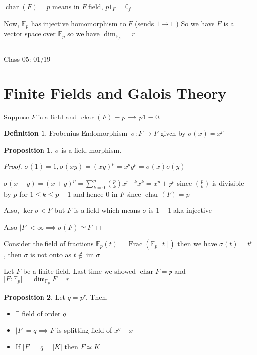 \documentclass{article}
\theoremstyle{definition}
\newtheorem{definition}{Definition}
\newtheorem{proposition}{Proposition}
\begin{document}
\(\operatorname{char}(F) = p \) means in \(F\) field, \(p 1_F = 0_f\)

Now, \(\mathbb{F} _p\) has injective homomorphism to \(F\) (sends \(1\to 1\) ) So we have \(F\) is a vector space over \(\mathbb{F} _p\) so we have \(\dim_{\mathbb{F} _p}=r\) 

\hfil
\hrule

Class 05: 01/19

\section*{Finite Fields and Galois Theory}

Suppose \(F\) is a field and \(\operatorname{char}(F) = p \implies p1 = 0\).

\begin{definition}
    Frobenius Endomorphism: \(\sigma : F \to F\) given by \(\sigma (x)=x^p\) 
\end{definition}

\begin{proposition}
    \(\sigma \) is a field morphism.
\end{proposition}

\begin{proof}
    \(\sigma (1)=1,\sigma (xy)=(xy)^p=x^p y^p = \sigma(x)\sigma (y)\)
    
    \(\sigma (x+y)=(x+y)^p=\sum_{k=0}^{p} \binom{p}{k}x^{p-k}x^k=x^p + y^p \) since \(\binom{p}{k}\) is divisible by \(p\) for \(1\leq k \leq p-1\) and hence \(0\) in \(F\) since \(\operatorname{char}(F) = p\) 
   
    Also, \(\ker \sigma \triangleleft F\) but \(F\) is a field which means \(\sigma \) is \(1-1\) aka injective
    
    Also \(\vert F \vert < \infty \implies \sigma(F) \simeq F\) 

\end{proof}

Consider the field of fractions \(\mathbb{F} _p(t)=\operatorname{Frac}(\mathbb{F} _p[t]) \) then we have \(\sigma(t)=t^p\), then \(\sigma\) is not onto as \(t\notin \operatorname{im}\sigma \)  

Let \(F\) be a finite field. Last time we showed \(\operatorname{char} F = p\) and \(\vert F : \mathbb{F}_p \vert = \dim_{\mathbb{F}_p}F = r \)  

\begin{proposition}
    Let \(q=p^r\). Then,
    
    \begin{itemize}
        \item \(\exists \) field of order \(q\) 
        \item \(\vert F \vert = q \implies F\) is splitting field of \(x^q - x\) 
        \item If \(\vert F \vert = q = \vert K \vert \) then \( F \simeq K\) 
    \end{itemize}

\end{proposition}
\end{document}
